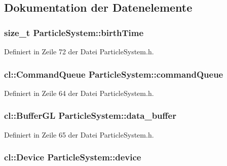 \subsection{Dokumentation der Datenelemente}
\hypertarget{classParticleSystem_ad01d21eff34d51267b5ec1b67abcd450}{
\subsubsection[{birth\-Time}]{\setlength{\rightskip}{0pt plus 5cm}size\-\_\-t Particle\-System\-::birth\-Time\hspace{0.3cm}{\ttfamily [private]}}}\label{classParticleSystem_ad01d21eff34d51267b5ec1b67abcd450}


Definiert in Zeile 72 der Datei Particle\-System.\-h.

\hypertarget{classParticleSystem_a6662c30fc239f2598b0d35f4be1ebb9e}{
\subsubsection[{command\-Queue}]{\setlength{\rightskip}{0pt plus 5cm}cl\-::\-Command\-Queue Particle\-System\-::command\-Queue\hspace{0.3cm}{\ttfamily [private]}}}\label{classParticleSystem_a6662c30fc239f2598b0d35f4be1ebb9e}


Definiert in Zeile 64 der Datei Particle\-System.\-h.

\hypertarget{classParticleSystem_a30d6a0f710c6f8412415491214b3fb38}{
\subsubsection[{data\-\_\-buffer}]{\setlength{\rightskip}{0pt plus 5cm}cl\-::\-Buffer\-G\-L Particle\-System\-::data\-\_\-buffer\hspace{0.3cm}{\ttfamily [private]}}}\label{classParticleSystem_a30d6a0f710c6f8412415491214b3fb38}


Definiert in Zeile 65 der Datei Particle\-System.\-h.

\hypertarget{classParticleSystem_a4772219c2578dfc5cfbe01cacec8a4c4}{
\subsubsection[{device}]{\setlength{\rightskip}{0pt plus 5cm}cl\-::\-Device Particle\-System\-::device\hspace{0.3cm}{\ttfamily [private]}}}\label{classParticleSystem_a4772219c2578dfc5cfbe01cacec8a4c4}


